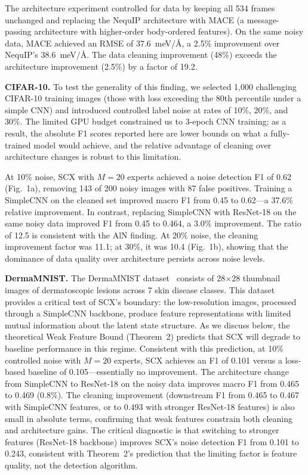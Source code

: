 \documentclass[12pt,a4paper]{article}
\begin{document}
The architecture experiment controlled for data by keeping all 534 frames unchanged and replacing the NequIP architecture with MACE (a message-passing architecture with higher-order body-ordered features). On the same noisy data, MACE achieved an RMSE of 37.6~meV/\AA, a 2.5\% improvement over NequIP's 38.6~meV/\AA. The data cleaning improvement (48\%) exceeds the architecture improvement (2.5\%) by a factor of 19.2.

\textbf{CIFAR-10.} To test the generality of this finding, we selected 1,000 challenging CIFAR-10 training images (those with loss exceeding the 80th percentile under a simple CNN) and introduced controlled label noise at rates of 10\%, 20\%, and 30\%. The limited GPU budget constrained us to 3-epoch CNN training; as a result, the absolute F1 scores reported here are lower bounds on what a fully-trained model would achieve, and the relative advantage of cleaning over architecture changes is robust to this limitation.

At 10\% noise, SCX with $M=20$ experts achieved a noise detection F1 of 0.62 (Fig.~1a), removing 143 of 200 noisy images with 87 false positives. Training a SimpleCNN on the cleaned set improved macro F1 from 0.45 to 0.62---a 37.6\% relative improvement. In contrast, replacing SimpleCNN with ResNet-18 on the same noisy data improved F1 from 0.45 to 0.464, a 3.0\% improvement. The ratio of 12.5 is consistent with the AlN finding. At 20\% noise, the cleaning improvement factor was 11.1; at 30\%, it was 10.4 (Fig.~1b), showing that the dominance of data quality over architecture persists across noise levels.

\textbf{DermaMNIST.} The DermaMNIST dataset~\cite{yang2023medmnist} consists of 28$\times$28 thumbnail images of dermatoscopic lesions across 7 skin disease classes. This dataset provides a critical test of SCX's boundary: the low-resolution images, processed through a SimpleCNN backbone, produce feature representations with limited mutual information about the latent state structure. As we discuss below, the theoretical Weak Feature Bound (Theorem~2) predicts that SCX will degrade to baseline performance in this regime. Consistent with this prediction, at 10\% controlled noise with $M=20$ experts, SCX achieves an F1 of 0.101 versus a loss-based baseline of 0.105---essentially no improvement. The architecture change from SimpleCNN to ResNet-18 on the noisy data improves macro F1 from 0.465 to 0.469 (0.8\%). The cleaning improvement (downstream F1 from 0.465 to 0.467 with SimpleCNN features, or to 0.493 with stronger ResNet-18 features) is also small in absolute terms, confirming that weak features constrain both cleaning and architecture gains. The critical diagnostic is that switching to stronger features (ResNet-18 backbone) improves SCX's noise detection F1 from 0.101 to 0.243, consistent with Theorem~2's prediction that the limiting factor is feature quality, not the detection algorithm.
\end{document}
